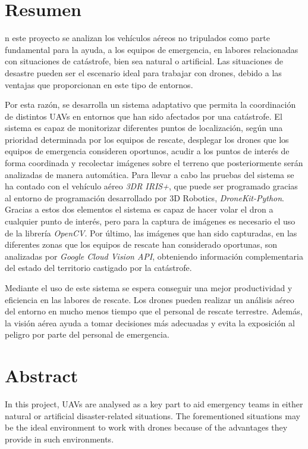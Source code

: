 \chapter{Resumen}

n este proyecto se analizan los vehículos aéreos no tripulados como parte fundamental para la ayuda, a los equipos de emergencia, en labores relacionadas con situaciones de catástrofe, bien sea natural o artificial. Las situaciones de desastre pueden ser el escenario ideal para trabajar con drones, debido a las ventajas que proporcionan en este tipo de entornos.

Por esta razón, se desarrolla un sistema adaptativo que permita la coordinación de distintos \acs{UAV}s en entornos que han sido afectados por una catástrofe. El sistema es capaz de monitorizar diferentes puntos de localización, según una prioridad determinada por los equipos de rescate, desplegar los drones que los equipos de emergencia consideren oportunos, acudir a los puntos de interés de forma coordinada y recolectar imágenes sobre el terreno que posteriormente serán analizadas de manera automática. Para llevar a cabo las pruebas del sistema se ha contado con el vehículo aéreo \textit{3DR IRIS+}, que puede ser programado gracias al entorno de programación desarrollado por 3D Robotics, \textit{DroneKit-Python}. Gracias a estos dos elementos el sistema es capaz de hacer volar el dron a cualquier punto de interés, pero para la captura de imágenes es necesario el uso de la librería \textit{OpenCV}. Por último, las imágenes que han sido capturadas, en las diferentes zonas que los equipos de rescate han considerado oportunas, son analizadas por \textit{Google Cloud Vision \acs{API}}, obteniendo información complementaria del estado del territorio castigado por la catástrofe.

Mediante el uso de este sistema se espera conseguir una mejor productividad y eficiencia en las labores de rescate. Los drones pueden realizar un análisis aéreo del entorno en mucho menos tiempo que el personal de rescate terrestre. Además, la visión aérea ayuda a tomar decisiones más adecuadas y evita la exposición al peligro por parte del personal de emergencia.

\chapter{Abstract}

In this project, \acs{UAV}s are analysed as a key part to aid emergency teams in either natural or artificial disaster-related situations. The forementioned situations may be the ideal environment to work with drones because of the advantages they provide in such environments.


